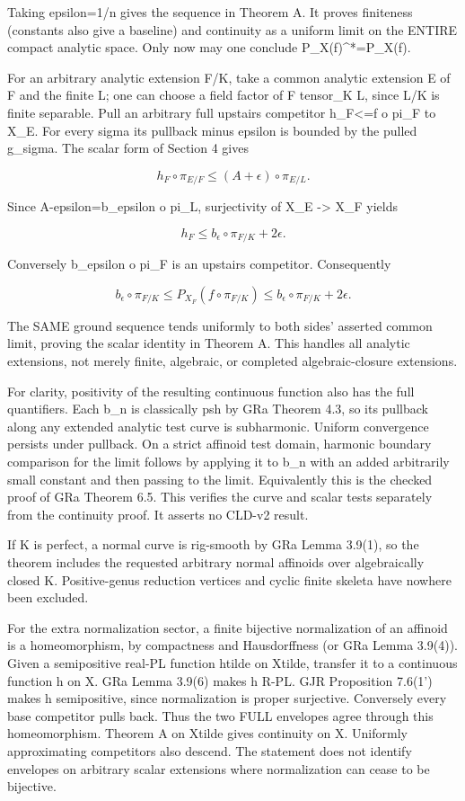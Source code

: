 \documentclass[11pt]{article}
\begin{document}
Taking epsilon=1/n gives the sequence in Theorem A. It proves finiteness (constants also give a baseline) and continuity as a uniform limit on the ENTIRE compact analytic space. Only now may one conclude P\_X(f)\textasciicircum{}*=P\_X(f).

For an arbitrary analytic extension F/K, take a common analytic extension E of F and the finite L; one can choose a field factor of F tensor\_K L, since L/K is finite separable. Pull an arbitrary full upstairs competitor h\_F<=f o pi\_F to X\_E. For every sigma its pullback minus epsilon is bounded by the pulled g\_sigma. The scalar form of Section 4 gives

\[
h_F\circ\pi_{E/F}\le(A+\epsilon)\circ\pi_{E/L}.
\]

Since A-epsilon=b\_epsilon o pi\_L, surjectivity of X\_E -> X\_F yields

\[
h_F\le b_\epsilon\circ\pi_{F/K}+2\epsilon.
\]

Conversely b\_epsilon o pi\_F is an upstairs competitor. Consequently

\[
b_\epsilon\circ\pi_{F/K}\le P_{X_F}(f\circ\pi_{F/K})\le b_\epsilon\circ\pi_{F/K}+2\epsilon.
\]

The SAME ground sequence tends uniformly to both sides' asserted common limit, proving the scalar identity in Theorem A. This handles all analytic extensions, not merely finite, algebraic, or completed algebraic-closure extensions.

For clarity, positivity of the resulting continuous function also has the full quantifiers. Each b\_n is classically psh by GRa Theorem 4.3, so its pullback along any extended analytic test curve is subharmonic. Uniform convergence persists under pullback. On a strict affinoid test domain, harmonic boundary comparison for the limit follows by applying it to b\_n with an added arbitrarily small constant and then passing to the limit. Equivalently this is the checked proof of GRa Theorem 6.5. This verifies the curve and scalar tests separately from the continuity proof. It asserts no CLD-v2 result.

If K is perfect, a normal curve is rig-smooth by GRa Lemma 3.9(1), so the theorem includes the requested arbitrary normal affinoids over algebraically closed K. Positive-genus reduction vertices and cyclic finite skeleta have nowhere been excluded.

For the extra normalization sector, a finite bijective normalization of an affinoid is a homeomorphism, by compactness and Hausdorffness (or GRa Lemma 3.9(4)). Given a semipositive real-PL function htilde on Xtilde, transfer it to a continuous function h on X. GRa Lemma 3.9(6) makes h R-PL. GJR Proposition 7.6(1') makes h semipositive, since normalization is proper surjective. Conversely every base competitor pulls back. Thus the two FULL envelopes agree through this homeomorphism. Theorem A on Xtilde gives continuity on X. Uniformly approximating competitors also descend. The statement does not identify envelopes on arbitrary scalar extensions where normalization can cease to be bijective.
\end{document}
